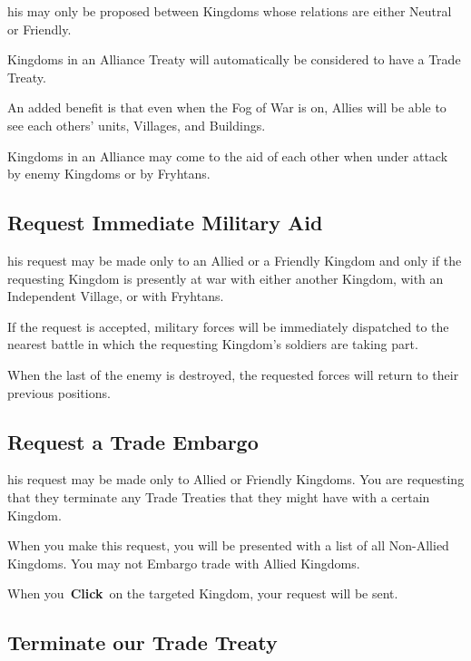 his may only be proposed between Kingdoms whose relations are either Neutral or Friendly.

Kingdoms in an Alliance Treaty will automatically be considered to have a Trade Treaty.

An added benefit is that even when the Fog of War is on, Allies will be able to see each others’ units, Villages, and Buildings.

Kingdoms in an Alliance may come to the aid of each other when under attack by enemy Kingdoms or by Fryhtans.

\subsection{Request Immediate Military Aid}


his request may be made only to an Allied or a Friendly Kingdom and only if the requesting Kingdom is presently at war with either another Kingdom, with an Independent Village, or with Fryhtans.

If the request is accepted, military forces will be immediately dispatched to the nearest battle in which the requesting Kingdom’s soldiers are taking part.

When the last of the enemy is destroyed, the requested forces will return to their previous positions.

\subsection{Request a Trade Embargo}


his request may be made only to Allied or Friendly Kingdoms. You are requesting that they terminate any Trade Treaties that they might have with a certain Kingdom.

When you make this request, you will be presented with a list of all Non-Allied Kingdoms. You may not Embargo trade with Allied Kingdoms.

When you \textbf{Click} on the targeted Kingdom, your request will be sent.

\subsection{Terminate our Trade Treaty}


